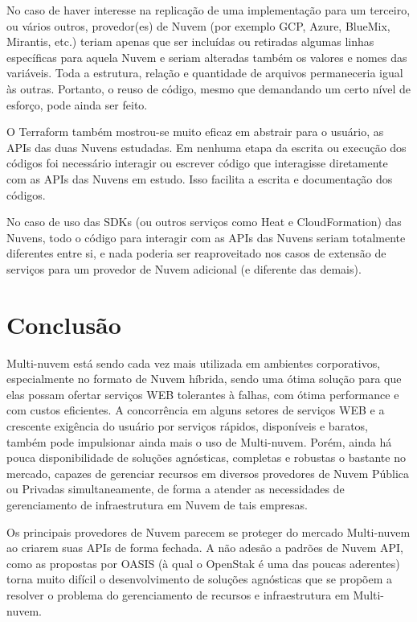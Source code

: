 \documentclass[12pt]{article}
\begin{document}
	No caso de haver interesse na replicação de uma implementação para um terceiro, ou vários outros, provedor(es) de Nuvem (por exemplo GCP, Azure, BlueMix, Mirantis, etc.) teriam apenas que ser incluídas ou retiradas algumas linhas específicas para aquela Nuvem e seriam alteradas também os valores e nomes das variáveis. Toda a estrutura, relação e quantidade de arquivos permaneceria igual às outras. Portanto, o reuso de código, mesmo que demandando um certo nível de esforço, pode ainda ser feito. 
	
	O Terraform também mostrou-se muito eficaz em abstrair para o usuário, as APIs das duas Nuvens estudadas. Em nenhuma etapa da escrita ou execução dos códigos foi necessário interagir ou escrever código que interagisse diretamente com as APIs das Nuvens em estudo. Isso facilita a escrita e documentação dos códigos.
	
	No caso de uso das SDKs (ou outros serviços como Heat e CloudFormation) das Nuvens, todo o código para interagir com as APIs das Nuvens seriam totalmente diferentes entre si, e nada poderia ser reaproveitado nos casos de extensão de serviços para um provedor de Nuvem adicional (e diferente das demais). 		
	
	\section{Conclusão}
	
	Multi-nuvem está sendo cada vez mais utilizada em ambientes corporativos, especialmente no formato de Nuvem híbrida, sendo uma ótima solução para que elas possam ofertar serviços WEB tolerantes à falhas, com ótima performance e com custos eficientes. A concorrência em alguns setores de serviços WEB e a crescente exigência do usuário por serviços rápidos, disponíveis e baratos, também pode impulsionar ainda mais o uso de Multi-nuvem. Porém, ainda há pouca disponibilidade de soluções agnósticas, completas e robustas o bastante no mercado, capazes de gerenciar recursos em diversos provedores de Nuvem Pública ou Privadas simultaneamente, de forma a atender as necessidades de gerenciamento de infraestrutura em Nuvem de tais empresas.
	
	Os principais provedores de Nuvem parecem se proteger do mercado Multi-nuvem ao criarem suas APIs de forma fechada. A não adesão a padrões de Nuvem API, como as propostas por OASIS \cite{CAMP:2019} (à qual o OpenStak é uma das poucas aderentes) torna muito difícil o desenvolvimento de soluções agnósticas que se propõem a resolver o problema do gerenciamento de recursos e infraestrutura em Multi-nuvem.
		
\end{document}
